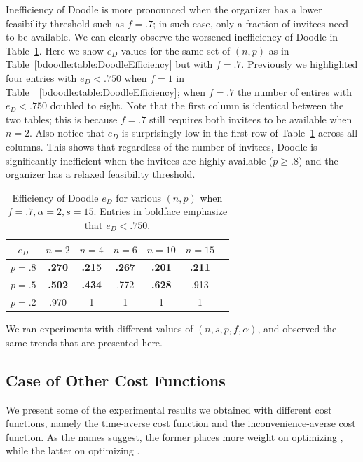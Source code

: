 Inefficiency of Doodle is more pronounced when the organizer has a lower feasibility threshold such as $f = .7$; in such case, only a fraction of invitees need to be available.
We can clearly observe the worsened inefficiency of Doodle in Table~\ref{bdoodle:table:DoodleEfficiency-lower-attendance}.
Here we show $e_{D}$ values for the same set of $(n, p)$ as in Table~\ref{bdoodle:table:DoodleEfficiency} but with $f = .7$.
Previously we highlighted four entries with $e_{D} < .750$ when $f = 1$ in Table~~\ref{bdoodle:table:DoodleEfficiency}; when $f = .7$ the number of entires with $e_{D} < .750$ doubled to eight.
Note that the first column is identical between the two tables; this is because $f = .7$ still requires both invitees to be available when $n = 2$.
Also notice that $e_{D}$ is surprisingly low in the first row of Table~\ref{bdoodle:table:DoodleEfficiency-lower-attendance} across all columns. This shows that regardless of the number of invitees, Doodle is significantly inefficient when the invitees are highly available ($p \geq .8$) and the organizer has a relaxed feasibility threshold.
\begin{table}[h]  %
\centering
\begin{tabular}{|c|c|c|c|c|c|c|}
	\hline
	$e_{D}$ & $n = 2$ & $n = 4$ & $n = 6$ & $ n = 10 $ & $n = 15$ \\ \hline
	$p = .8$ & \textbf{.270} & \textbf{.215} & \textbf{.267} & \textbf{.201} & \textbf{.211} \\ \hline
	$p = .5$ & \textbf{.502} & \textbf{.434} & .772 & \textbf{.628} & .913  \\ \hline
	$p = .2$ & .970 & 1 & 1 & 1 & 1\\ \hline
\end{tabular}
\caption{Efficiency of Doodle $e_{D}$ for various $(n, p)$ when $f = .7, \alpha=2, s = 15$.
Entries in boldface emphasize that $e_{D} < .750$.
} \label{bdoodle:table:DoodleEfficiency-lower-attendance}
\end{table}

We ran experiments with different values of $(n, s, p, f, \alpha)$, and observed the same  trends that are presented here.



\subsection{Case of Other Cost Functions}
We present some of the experimental results we obtained with different cost functions, namely the time-averse cost function and the inconvenience-averse cost function. As the names suggest, the former places more weight on optimizing \Time, while the latter on optimizing \Inconvenience. \\

